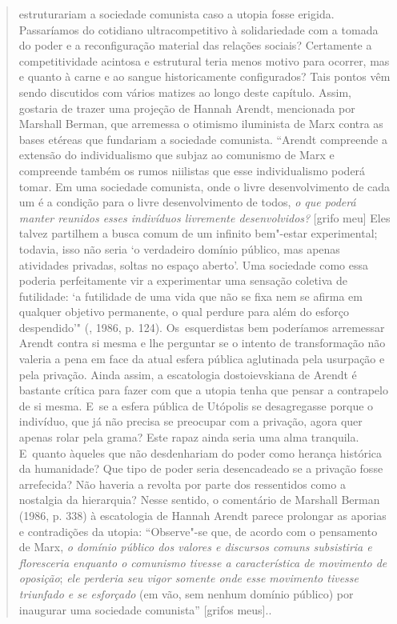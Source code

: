 {\begin{quote}
{  estruturariam a sociedade comunista caso a utopia fosse erigida.
  Passaríamos do cotidiano ultracompetitivo à solidariedade com a tomada
  do poder e a reconfiguração material das relações sociais? Certamente
  a competitividade acintosa e estrutural teria menos motivo para
  ocorrer, mas e quanto à carne e ao sangue historicamente configurados?
  Tais pontos vêm sendo discutidos com vários matizes ao longo deste
  capítulo. Assim, gostaria de trazer uma projeção de Hannah Arendt,
  mencionada por Marshall Berman, que arremessa o otimismo iluminista de
  Marx contra as bases etéreas que fundariam a sociedade comunista.
  ``Arendt compreende a extensão do individualismo que subjaz ao
  comunismo de Marx e compreende também os rumos niilistas que esse
  individualismo poderá tomar. Em uma sociedade comunista, onde o livre
  desenvolvimento de cada um é a condição para o livre desenvolvimento
  de todos, \emph{o que poderá manter reunidos esses indivíduos
  livremente desenvolvidos?} {[}grifo meu{]} Eles talvez partilhem a
  busca comum de um infinito bem"-estar experimental; todavia, isso não
  seria `o verdadeiro domínio público, mas apenas atividades privadas,
  soltas no espaço aberto'. Uma sociedade como essa poderia
  perfeitamente vir a experimentar uma sensação coletiva de futilidade:
  `a futilidade de uma vida que não se fixa nem se afirma em qualquer
  objetivo permanente, o qual perdure para além do esforço despendido'"
  (, 1986, p. 124). Os~esquerdistas bem poderíamos arremessar
  Arendt contra si mesma e lhe perguntar se o intento de transformação
  não valeria a pena em face da atual esfera pública aglutinada pela
  usurpação e pela privação. Ainda assim, a escatologia dostoievskiana
  de Arendt é bastante crítica para fazer com que a utopia tenha que
  pensar a contrapelo de si mesma. E~se a esfera pública de Utópolis se
  desagregasse porque o indivíduo, que já não precisa se preocupar com a
  privação, agora quer apenas rolar pela grama? Este rapaz ainda seria
  uma alma tranquila. E~quanto àqueles que não desdenhariam do poder
  como herança histórica da humanidade? Que tipo de poder seria
  desencadeado se a privação fosse arrefecida? Não haveria a revolta por
  parte dos ressentidos como a nostalgia da hierarquia? Nesse sentido, o
  comentário de Marshall Berman (1986, p. 338) à escatologia de Hannah
  Arendt parece prolongar as aporias e contradições da utopia:
  ``Observe"-se que, de acordo com o pensamento de Marx, \emph{o domínio
  público dos valores e discursos comuns subsistiria e floresceria
  enquanto o comunismo tivesse a característica de movimento de
  oposição}; \emph{ele perderia seu vigor somente onde esse movimento
  tivesse triunfado e se esforçado} (em vão, sem nenhum domínio público)
  por inaugurar uma sociedade comunista'' {[}grifos meus{]}.}.


\end{quote}}
